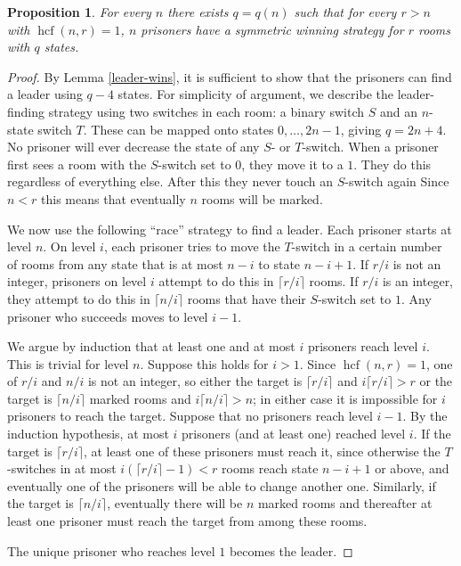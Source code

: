 \documentclass[10pt,a4paper]{amsart}
\newtheorem{proposition}{Proposition}
\newcommand{\hcf}{\operatorname{hcf}}
\begin{document}
	\begin{proposition}\label{n-smaller}
		For every $n$ there exists $q=q(n)$ such that for every $r>n$ with $\hcf(n,r)=1$, $n$ prisoners have a symmetric winning strategy for $r$ rooms with $q$ states.
	\end{proposition}

	\begin{proof}
		By Lemma \ref{leader-wins}, it is sufficient to show that the prisoners can find a leader using $q-4$ states. For simplicity of argument, we describe the leader-finding strategy using two switches in each room: a binary switch $S$ and an $n$-state switch $T$. These can be mapped onto states $0,\ldots, 2n-1$, giving $q=2n+4$.
		No prisoner will ever decrease the state of any $S$- or $T$-switch. When a prisoner first sees a room with the $S$-switch set to $0$, they move it to a $1$. They do this regardless of everything else. After this they never touch an $S$-switch again 
		Since $n < r$ this means that eventually $n$ rooms will be marked.
		
		We now use the following ``race'' strategy to find a leader. Each prisoner starts at level $n$. 
		On level $i$, each prisoner tries to move the $T$-switch in a certain number of rooms from any state that is at most $n-i$ to state $n-i+1$. 
		If $r/i$ is not an integer, prisoners on level $i$ attempt to do this in $\lceil r/i\rceil$ rooms. If $r/i$ is an integer, they attempt to do this in $\lceil n/i\rceil$
		rooms that have their $S$-switch set to $1$. Any prisoner who succeeds moves to level $i-1$.
		
		We argue by induction that at least one and at most $i$ prisoners reach level $i$. This is trivial
		for level $n$. Suppose this holds for $i > 1$. Since $\hcf(n, r) = 1$, one of $r/i$ and $n/i$ is not an integer,
		so either the target is $\lceil r/i\rceil$ and $i\lceil r/i\rceil>r$ or the target is $\lceil n/i\rceil$ marked rooms and $i\lceil n/i\rceil>n$; 
		in either case it is impossible for $i$ prisoners to reach the target. Suppose that no prisoners reach level $i-1$. By the induction
		hypothesis, at most $i$ prisoners (and at least one) reached level $i$. If the target is $\lceil r/i\rceil$, at least one of these prisoners must reach it,
		since otherwise the $T$-switches in at most $i(\lceil r/i\rceil-1) < r$ rooms reach state $n-i+1$ or above, and eventually one of the prisoners will be able to change another one.
		Similarly, if the target is $\lceil n/i\rceil$, eventually there will be $n$ marked rooms and thereafter at least one prisoner must reach the target from among these rooms.
		
		The unique prisoner who reaches level $1$ becomes the leader. 
	\end{proof}
\end{document}
